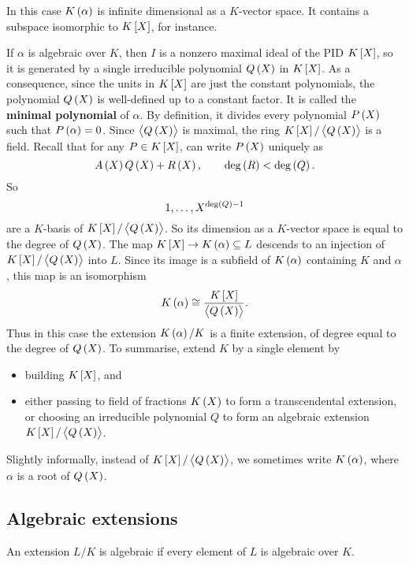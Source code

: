 \begin{note*}
In this case $ K\br{\alpha} $ is infinite dimensional as a $ K $-vector space. It contains a subspace isomorphic to $ K\sbr{X} $, for instance.
\end{note*}

If $ \alpha $ is algebraic over $ K $, then $ I $ is a nonzero maximal ideal of the PID $ K\sbr{X} $, so it is generated by a single irreducible polynomial $ Q\br{X} $ in $ K\sbr{X} $. As a consequence, since the units in $ K\sbr{X} $ are just the constant polynomials, the polynomial $ Q\br{X} $ is well-defined up to a constant factor. It is called the \textbf{minimal polynomial} of $ \alpha $. By definition, it divides every polynomial $ P\br{X} $ such that $ P\br{\alpha} = 0 $. Since $ \abr{Q\br{X}} $ is maximal, the ring $ K\sbr{X} / \abr{Q\br{X}} $ is a field. Recall that for any $ P \in K\sbr{X} $, can write $ P\br{X} $ uniquely as
$$ A\br{X}Q\br{X} + R\br{X}, \qquad \deg\br{R} < \deg\br{Q}. $$
So
$$ 1, \dots, X^{\deg\br{Q} - 1} $$
are a $ K $-basis of $ K\sbr{X} / \abr{Q\br{X}} $. So its dimension as a $ K $-vector space is equal to the degree of $ Q\br{X} $. The map $ K\sbr{X} \to K\br{\alpha} \subseteq L $ descends to an injection of $ K\sbr{X} / \abr{Q\br{X}} $ into $ L $. Since its image is a subfield of $ K\br{\alpha} $ containing $ K $ and $ \alpha $, this map is an isomorphism
$$ K\br{\alpha} \cong \dfrac{K\sbr{X}}{\abr{Q\br{X}}}. $$
Thus in this case the extension $ K\br{\alpha} / K $ is a finite extension, of degree equal to the degree of $ Q\br{X} $. To summarise, extend $ K $ by a single element by
\begin{itemize}
\item building $ K\sbr{X} $, and
\item either passing to field of fractions $ K\br{X} $ to form a transcendental extension, or choosing an irreducible polynomial $ Q $ to form an algebraic extension $ K\sbr{X} / \abr{Q\br{X}} $.
\end{itemize}
Slightly informally, instead of $ K\sbr{X} / \abr{Q\br{X}} $, we sometimes write $ K\br{\alpha} $, where $ \alpha $ is a root of $ Q\br{X} $.

\subsection{Algebraic extensions}

\begin{definition}
An extension $ L / K $ is algebraic if every element of $ L $ is algebraic over $ K $.
\end{definition}

